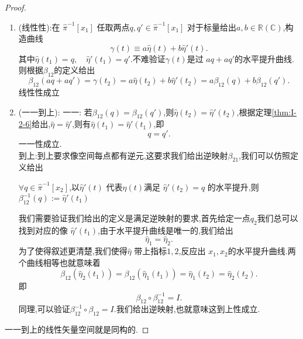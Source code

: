 \documentclass[../main.tex]{subfiles}
\begin{document}
\begin{proof}
  \begin{enumerate}
  \item (线性性):在 $\hat{\pi}^{-1}[x_1]$ 任取两点$q,q' \in \hat{\pi}^{-1}[x_1]$ 对于标量给出$a,b \in \mathbb{R}(\mathbb{C})$,构造曲线\[\gamma(t) \equiv a \hat{\eta}(t) + b \hat{\eta}'(t).\]
    其中$\hat{\eta}(t_1) = q,\quad \hat{\eta}'(t_1) = q'$.不难验证$\gamma(t)$是过 $aq + aq'$的水平提升曲线.则根据$\beta_{12}$的定义给出 \[
      \beta_{12}(a q + aq') = \gamma(t_2) = a \hat{\eta}(t_2) + b \hat{\eta}'(t_2) = a \beta_{12}(q) + b \beta_{12}(q')
    .\] 线性性成立
  \item(一一到上): 一一: 若$\beta_{12}(q) = \beta_{12}(q')$,则$\hat{\eta}(t_2) = \hat{\eta}'(t_2)$,根据定理\ref{thm:I-2-6}给出,$\hat{\eta} = \hat{\eta}'$,则有$\hat{\eta}(t_1) = \hat{\eta}'(t_1)$,即\[
 q = q' 
  .\]一一性成立.\\
  到上:到上要求像空间每点都有逆元,这要求我们给出逆映射$\beta_{21}$,我们可以仿照定义给出
  \begin{center}
    $\forall q \in \hat{\pi}^{-1}[x_2]$,以$\hat{\eta}'(t)$ 代表$\eta(t)$满足 $\hat{\eta}'(t_2) = q $ 的水平提升,则$\beta_{12}^{-1}(q) := \hat{\eta}'(t_1)$ 
  \end{center}
  我们需要验证我们给出的定义是满足逆映射的要求,首先给定一点$q_2$我们总可以找到对应的像 $\hat{\eta}'(t_1)$,由于水平提升曲线是唯一的,我们给出\[
 \hat{\eta}_1 = \hat{\eta}_2 
  .\] 
  为了使得叙述更清楚,我们使得$\hat{\eta}$ 带上指标$1,2$,反应出 $x_1,x_2$的水平提升曲线.两个曲线相等也就意味着 \[
    \beta_{12}(\hat{\eta}_2(t_1)) =  \beta_{12}(\hat{\eta}_1(t_1)) = \hat{\eta}_1(t_2) = \hat{\eta}_2(t_2)
  .\] 
  即\[
    \beta_{12}\circ \beta_{12}^{-1} =  I
  .\] 
  同理,可以验证$    \beta_{12}^{-1}\circ \beta_{12} =  I$.我们给出逆映射,也就意味这到上性成立.
\end{enumerate}
一一到上的线性矢量空间就是同构的.
\end{proof}
\end{document}
